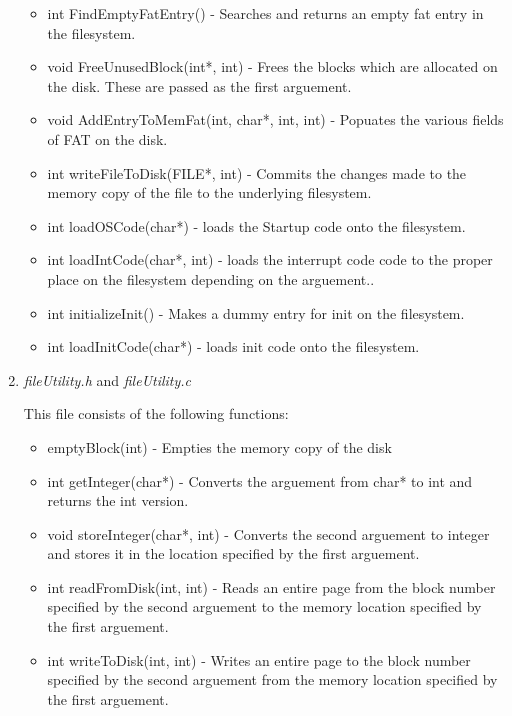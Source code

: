 \begin{enumerate}
\begin{itemize}
		\item int FindEmptyFatEntry() - Searches and returns an empty fat entry in the filesystem.
		\item void FreeUnusedBlock(int*, int) - Frees the blocks which are allocated on the disk. These are passed as the first arguement.
		
		\item void AddEntryToMemFat(int, char*, int, int) - Popuates the various fields of FAT on the disk.
		\item int writeFileToDisk(FILE*, int) - Commits the changes made to the memory copy of the file to the underlying filesystem.
		
		\item int loadOSCode(char*) - loads the Startup code onto the filesystem.
		
		\item int loadIntCode(char*, int) - loads the interrupt code code to the proper place on the filesystem depending on the arguement..
		
		\item int initializeInit() - Makes a dummy entry for init on the filesystem.
		
		\item int loadInitCode(char*) - loads init code onto the filesystem.
	\end{itemize}
	
	\item \textit{fileUtility.h} and \textit{fileUtility.c}
	
	This file consists of the following functions:
	\begin{itemize}
		\item emptyBlock(int) - Empties the memory copy of the disk
		
		\item int getInteger(char*) - Converts the arguement from char* to int and returns the int version.
		
		\item void storeInteger(char*, int) - Converts the second arguement to integer and stores it in the location specified by the first arguement. 
		
		\item int readFromDisk(int, int) - Reads an entire page from the block number specified by the second arguement to the memory location  specified by the first arguement.
		
		\item int writeToDisk(int, int) - Writes an entire page to the block number specified by the second arguement from the memory location specified by the first arguement.
		

\end{itemize}
\end{enumerate}
